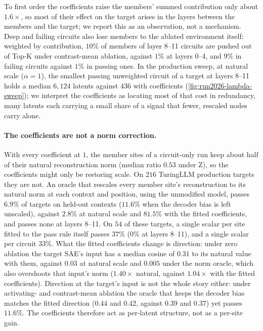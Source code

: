 \documentclass[10pt]{article}
\begin{document}
To first order the coefficients raise the members' summed contribution only about $1.6\times$, so most of their effect on the target arises in the layers between the members and the target; we report this as an observation, not a mechanism.
Deep and failing circuits also lose members to the ablated environment itself: weighted by contribution, $10\%$ of members of layer 8--11 circuits are pushed out of Top-K under contrast-mean ablation, against $1\%$ at layers 0--4, and $9\%$ in failing circuits against $1\%$ in passing ones.
In the production sweep, at natural scale ($\alpha = 1$), the smallest passing unweighted circuit of a target at layers 8--11 holds a median $6{,}124$ latents against $436$ with coefficients (\cref{fig:run2026-lambda-sweep}); we interpret the coefficients as locating most of that cost in redundancy, many latents each carrying a small share of a signal that fewer, rescaled nodes carry alone.

\paragraph{The coefficients are not a norm correction.}
With every coefficient at $1$, the member sites of a circuit-only run keep about half of their natural reconstruction norm (median ratio $0.53$ under Z), so the coefficients might only be restoring scale.
On $216$ TuringLLM production targets they are not.
An oracle that rescales every member site's reconstruction to its natural norm at each context and position, using the unmodified model, passes $6.9\%$ of targets on held-out contexts ($11.6\%$ when the decoder bias is left unscaled), against $2.8\%$ at natural scale and $81.5\%$ with the fitted coefficients, and passes none at layers 8--11.
On $54$ of these targets, a single scalar per site fitted to the pass rule itself passes $37\%$ ($0\%$ at layers 8--11), and a single scalar per circuit $33\%$.
What the fitted coefficients change is direction: under zero ablation the target SAE's input has a median cosine of $0.31$ to its natural value with them, against $0.03$ at natural scale and $0.005$ under the norm oracle, which also overshoots that input's norm ($1.40\times$ natural, against $1.04\times$ with the fitted coefficients).
Direction at the target's input is not the whole story either: under activating- and contrast-mean ablation the oracle that keeps the decoder bias matches the fitted direction ($0.44$ and $0.42$, against $0.39$ and $0.37$) yet passes $11.6\%$.
The coefficients therefore act as per-latent structure, not as a per-site gain.
\end{document}
